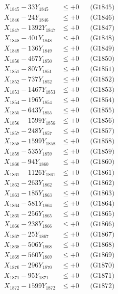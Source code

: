 \documentclass[a4paper,10pt]{article}
\begin{document}
{\begin{align}
X_{1845} - 33Y_{1845} &\leq +0 && \text{(G1845)} \\
X_{1846} - 24Y_{1846} &\leq +0 && \text{(G1846)} \\
X_{1847} - 1392Y_{1847} &\leq +0 && \text{(G1847)} \\
X_{1848} - 401Y_{1848} &\leq +0 && \text{(G1848)} \\
X_{1849} - 136Y_{1849} &\leq +0 && \text{(G1849)} \\
X_{1850} - 467Y_{1850} &\leq +0 && \text{(G1850)} \\
\allowbreak
X_{1851} - 807Y_{1851} &\leq +0 && \text{(G1851)} \\
X_{1852} - 737Y_{1852} &\leq +0 && \text{(G1852)} \\
X_{1853} - 1467Y_{1853} &\leq +0 && \text{(G1853)} \\
X_{1854} - 196Y_{1854} &\leq +0 && \text{(G1854)} \\
X_{1855} - 643Y_{1855} &\leq +0 && \text{(G1855)} \\
X_{1856} - 1599Y_{1856} &\leq +0 && \text{(G1856)} \\
X_{1857} - 248Y_{1857} &\leq +0 && \text{(G1857)} \\
X_{1858} - 1599Y_{1858} &\leq +0 && \text{(G1858)} \\
X_{1859} - 535Y_{1859} &\leq +0 && \text{(G1859)} \\
X_{1860} - 94Y_{1860} &\leq +0 && \text{(G1860)} \\
\allowbreak
X_{1861} - 1126Y_{1861} &\leq +0 && \text{(G1861)} \\
X_{1862} - 263Y_{1862} &\leq +0 && \text{(G1862)} \\
X_{1863} - 185Y_{1863} &\leq +0 && \text{(G1863)} \\
X_{1864} - 581Y_{1864} &\leq +0 && \text{(G1864)} \\
X_{1865} - 256Y_{1865} &\leq +0 && \text{(G1865)} \\
X_{1866} - 238Y_{1866} &\leq +0 && \text{(G1866)} \\
X_{1867} - 25Y_{1867} &\leq +0 && \text{(G1867)} \\
X_{1868} - 506Y_{1868} &\leq +0 && \text{(G1868)} \\
X_{1869} - 560Y_{1869} &\leq +0 && \text{(G1869)} \\
X_{1870} - 296Y_{1870} &\leq +0 && \text{(G1870)} \\
\allowbreak
X_{1871} - 95Y_{1871} &\leq +0 && \text{(G1871)} \\
X_{1872} - 1599Y_{1872} &\leq +0 && \text{(G1872)} \\

\end{align}}
\end{document}
